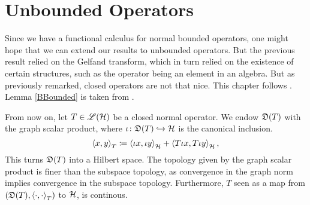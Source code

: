 \section{Unbounded Operators}\label{section3}



Since we have a functional calculus for normal bounded operators, one might hope 
that we can extend our results to unbounded operators. But the previous 
result relied on the Gelfand transform, which in turn relied on the existence
of certain structures, such as the operator being an element in an algebra. 
But as previously remarked, closed operators are not that nice.
This chapter follows \cite{LesHaupt}. Lemma \ref{BBounded} is taken from 
\cite[p. 319]{ConFuncAna}.

From now on, let $T \in \mathscr{L}(\mathcal{H})$ be a closed normal operator. 
We endow $\mathfrak{D}(T)$ with the graph scalar product, where 
$\iota\colon \mathfrak{D}(T) \hookrightarrow \mathcal{H}$ is the canonical inclusion.
\[
 \left\langle x,y \right\rangle_T \coloneqq  \left\langle \iota x, \iota y \right\rangle_{\mathcal{H}} +
 \left\langle  T \iota x, T \iota y \right\rangle_{\mathcal{H}},
\]
This turns $\mathfrak{D}(T)$ into a Hilbert space. The topology given by the graph scalar product
is finer than the subspace topology, as convergence in the graph norm
 implies convergence in the subspace topology. Furthermore,
$T$ seen as a map from $( \mathfrak{D}(T) , \left\langle \cdot, \cdot \right\rangle_T)$ to $\mathcal{H}$, is 
continous.

